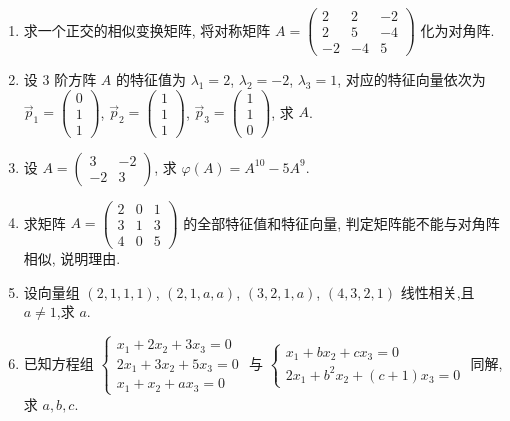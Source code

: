 \begin{enumerate}
	
	\item 求一个正交的相似变换矩阵, 将对称矩阵 $A =
	\begin{pmatrix}
		2 & 2 & -2 \\
		2 & 5 & -4 \\
		-2 & -4 & 5
	\end{pmatrix}$ 化为对角阵.
	
	
	\item 设 $3$ 阶方阵 $A$ 的特征值为 $\lambda_1 = 2$, $\lambda_2 = -2$, $\lambda_3 = 1$, 对应的特征向量依次为
	$\vec{p}_1 = \begin{pmatrix} 0 \\ 1 \\ 1 \end{pmatrix}$, $\vec{p}_2 = \begin{pmatrix} 1 \\ 1 \\ 1 \end{pmatrix}$, $\vec{p}_3 = \begin{pmatrix} 1 \\ 1 \\ 0 \end{pmatrix}$, 求 $A$.
	
	
	
	\item 设 $A =
	\begin{pmatrix}
		3 & -2 \\
		-2 & 3
	\end{pmatrix}$, 求 $\varphi(A) = A^{10} - 5A^9$.
	
	
	\item 求矩阵 $A =
	\begin{pmatrix}
		2 & 0 & 1 \\
		3 & 1 & 3 \\
		4 & 0 & 5
	\end{pmatrix}$ 的全部特征值和特征向量, 判定矩阵能不能与对角阵相似, 说明理由.
	
	
	
	\item 设向量组 $(2, 1, 1, 1)$, $(2, 1, a, a)$, $(3, 2, 1, a)$, $(4, 3, 2, 1)$ 线性相关,且 $a \ne 1$,求 $a$.
	
	\item 已知方程组 
	$\begin{cases} 
		x_1 + 2x_2 + 3x_3 = 0 \\ 
		2x_1 + 3x_2 + 5x_3 = 0 \\
		x_1 + x_2 + ax_3 = 0 
	\end{cases}$ 
	与 
	$\begin{cases} 
		x_1 + bx_2 + cx_3 = 0 \\ 
		2x_1 + b^2x_2 + (c+1)x_3 = 0 
	\end{cases}$ 
	同解,求 $a, b, c$.
	

\end{enumerate}
